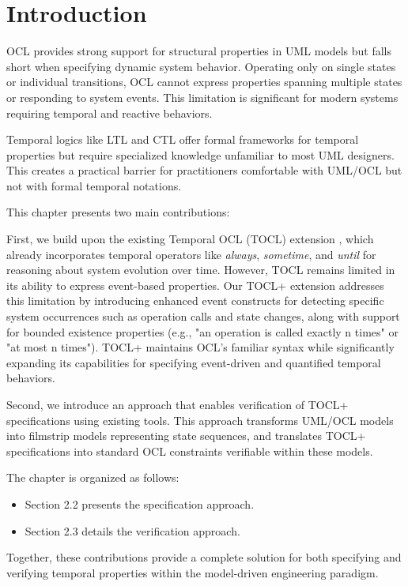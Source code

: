 \section{Introduction}

\hspace{1cm} OCL provides strong support for structural properties in UML models but 
falls short when specifying dynamic system behavior. Operating only on single states 
or individual transitions, OCL cannot express properties spanning multiple states or 
responding to system events. This limitation is significant for modern systems 
requiring temporal and reactive behaviors.

Temporal logics like LTL and CTL offer formal frameworks for temporal properties but 
require specialized knowledge unfamiliar to most UML designers. This creates a practical 
barrier for practitioners comfortable with UML/OCL but not with formal temporal notations.

This chapter presents two main contributions:

First, we build upon the existing Temporal OCL (TOCL) extension \cite{TOCL}, which already 
incorporates temporal operators like \textit{always}, \textit{sometime}, and 
\textit{until} for reasoning about system evolution over time. However, TOCL remains 
limited in its ability to express event-based properties. Our TOCL+ extension 
addresses this limitation by introducing enhanced event constructs for detecting 
specific system occurrences such as operation calls and state changes, along with 
support for bounded existence properties (e.g., "an operation is called exactly n 
times" or "at most n times"). TOCL+ maintains OCL's familiar syntax while 
significantly expanding its capabilities for specifying event-driven and quantified 
temporal behaviors.

Second, we introduce an approach that enables verification of TOCL+ 
specifications using existing tools. This approach transforms UML/OCL models into 
filmstrip models representing state sequences, and translates TOCL+ specifications 
into standard OCL constraints verifiable within these models.

The chapter is organized as follows:
\begin{itemize}
    \item Section 2.2 presents the specification approach.
    
    \item Section 2.3 details the verification approach.
\end{itemize}

Together, these contributions provide a complete solution for both specifying and 
verifying temporal properties within the model-driven engineering paradigm.